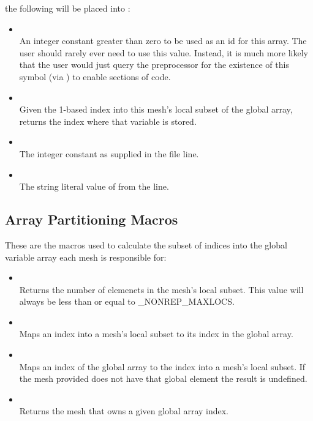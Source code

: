 the following will be placed into :
\begin{itemize}
\item {}\\
An integer constant greater than zero to be used as an id for this array.
The user should rarely ever need to use this value.  Instead, it is much more
likely that the user would just query the preprocessor for the existence of
this symbol (via ) to enable sections of code.
\item {}\\
Given the 1-based index into this mesh's local subset of the global
array, returns the  index where that variable is stored.
\item {}\\
The integer constant  as supplied in the  file
 line.
\item {}\\
The string literal value of  from the  line.
\end{itemize}

\subsection{Array Partitioning Macros}
These are the macros used to calculate the subset of indices into the global
variable array each mesh is responsible for:
\begin{itemize}
\item {}\\
Returns the number of elemenets in the mesh's local subset.  This value will always
be less than or equal to _NONREP_MAXLOCS.
\item {}\\
Maps an index into a mesh's local subset to its index in the global array.
\item {}\\
Maps an index of the global array to the index into a mesh's local subset.  If the
mesh provided does not have that global element the result is undefined.
\item {}\\
Returns the mesh that owns a given global array index.
\end{itemize}

